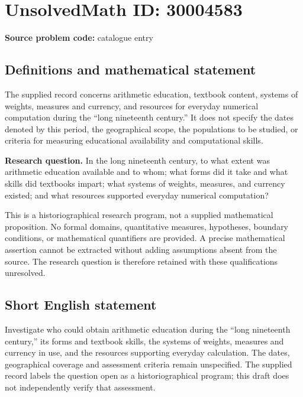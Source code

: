 \documentclass[11pt]{article}
\begin{document}
\section*{UnsolvedMath ID: 30004583}
\textbf{Source problem code:} catalogue entry
\subsection{Definitions and mathematical statement}
The supplied record concerns arithmetic education, textbook content, systems of weights, measures and currency, and resources for everyday numerical computation during the ``long nineteenth century.'' It does not specify the dates denoted by this period, the geographical scope, the populations to be studied, or criteria for measuring educational availability and computational skills.

\textbf{Research question.} In the long nineteenth century, to what extent was arithmetic education available and to whom; what forms did it take and what skills did textbooks impart; what systems of weights, measures, and currency existed; and what resources supported everyday numerical computation?

This is a historiographical research program, not a supplied mathematical proposition. No formal domains, quantitative measures, hypotheses, boundary conditions, or mathematical quantifiers are provided. A precise mathematical assertion cannot be extracted without adding assumptions absent from the source. The research question is therefore retained with these qualifications unresolved.
\subsection{Short English statement}
Investigate who could obtain arithmetic education during the ``long nineteenth century,'' its forms and textbook skills, the systems of weights, measures and currency in use, and the resources supporting everyday calculation. The dates, geographical coverage and assessment criteria remain unspecified. The supplied record labels the question open as a historiographical program; this draft does not independently verify that assessment.
\end{document}
